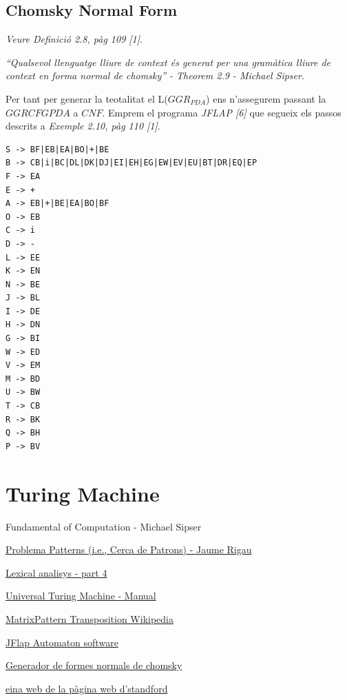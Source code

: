 \documentclass[12pt,a4paper]{report}
\def \pdaCFG{$GGRCFG{PDA} $}
\def \pda{$GGR_{PDA} $}
\begin{document}
\section{Chomsky Normal Form}

\textit{Veure Definició 2.8, pàg 109 [1]}.

\textit{“Qualsevol llenguatge lliure de context és generat per una gramàtica lliure de context en forma normal de chomsky” - Theorem 2.9 - Michael Sipser}.

Per tant per generar la teotalitat el L(\pda{}) ens n’assegurem passant la \pdaCFG{} a $CNF$. Emprem el programa \textit{JFLAP [6]} que segueix els passos descrits a \textit{Exemple 2.10, pàg 110 [1]}.

\begin{lstlisting}
S -> BF|EB|EA|BO|+|BE
B -> CB|i|BC|DL|DK|DJ|EI|EH|EG|EW|EV|EU|BT|DR|EQ|EP
F -> EA
E -> +
A -> EB|+|BE|EA|BO|BF
O -> EB
C -> i
D -> -
L -> EE
K -> EN
N -> BE
J -> BL
I -> DE
H -> DN
G -> BI
W -> ED
V -> EM
M -> BD
U -> BW
T -> CB
R -> BK
Q -> BH
P -> BV
\end{lstlisting}

\clearpage

\chapter{Turing Machine}



\begin{multicols}{2}
\end{multicols}



\begin{thebibliography}{9}
Fundamental of Computation - Michael Sipser

\hyperlink{http://ima.udg.edu/~rigau/FC/FC_patterns.pdf}{Problema Patterns (i.e., Cerca de Patrons) - Jaume Rigau}

\hyperlink{http://ima.udg.edu/~rigau/FC/MFAP.pdf}{Lexical analisys - part 4}

\hyperlink{http://ima.udg.edu/~rigau/FC/utm_read_me.pdf}{Universal Turing Machine - Manual}

\hyperlink{https://en.wikipedia.org/wiki/Transpose}{MatrixPattern Transposition Wikipedia}

\hyperlink{http://www.jflap.org/}{JFlap Automaton software}

\hyperlink{https://mpeveler.com/assets/content/projects/cfg2cnf.php}{Generador de formes normals de chomsky}

\hyperlink{https://web.stanford.edu/class/archive/cs/cs103/cs103.1156/tools/cfg/}{eina web de la pàgina web d’standford}

\end{thebibliography}

\printindex
\end{document}
